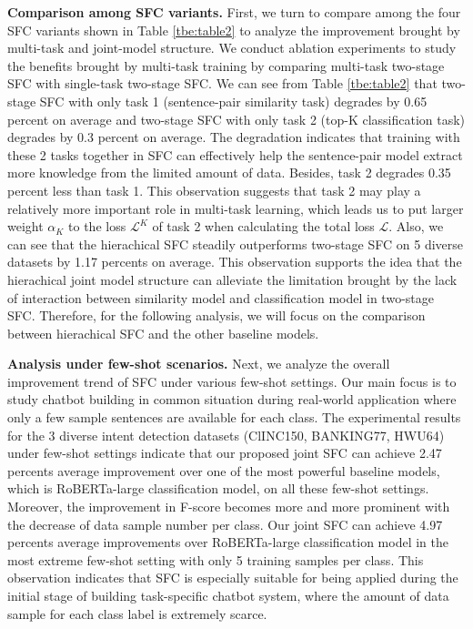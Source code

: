 \documentclass[letterpaper]{article} %
\begin{document}
  \textbf{Comparison  among  SFC  variants.} First, we turn to compare among the
  four  SFC  variants shown in Table \ref{tbe:table2} to analyze the improvement
  brought  by  multi-task  and  joint-model  structure. We conduct
  ablation  experiments  to study the benefits brought by multi-task training by
  comparing multi-task two-stage SFC with single-task two-stage SFC. We can see from
  Table  \ref{tbe:table2}  that  two-stage  SFC  with  only  task 1 (sentence-pair
  similarity task) degrades by 0.65 percent on average and two-stage SFC with only
  task  2  (top-K  classification  task) degrades by 0.3 percent on average. The
  degradation  indicates  that  training  with these 2 tasks together in SFC can
  effectively  help  the  sentence-pair  model  extract  more knowledge from the
  limited  amount  of data. Besides, task 2 degrades 0.35 percent less than task
  1.  This observation suggests that task 2 may play a relatively more important
  role  in multi-task learning, which leads us to put larger weight $\alpha_{K}$
  to  the  loss  $\mathcal{L}^{K}$  of  task  2  when calculating the total loss
  $\mathcal{L}$.  Also, we can see that the hierachical SFC steadily outperforms
  two-stage  SFC  on  5  diverse  datasets  by  1.17  percents  on  average.  This
  observation  supports  the idea that the hierachical joint model structure can
  alleviate the limitation brought by the lack of interaction between similarity
  model  and  classification  model in two-stage SFC. Therefore, for the following
  analysis,  we  will  focus  on  the comparison between hierachical SFC and the
  other baseline models.

  \textbf{Analysis  under  few-shot  scenarios.}  Next,  we  analyze the overall
  improvement trend of SFC under various few-shot settings. Our main focus is to
  study chatbot building in common situation during real-world application where
  only  a  few  sample  sentences are available for each class. The experimental
  results  for  the  3  diverse  intent detection datasets (ClINC150, BANKING77,
  HWU64) under few-shot settings indicate that our proposed joint SFC can
  achieve  2.47  percents  average  improvement  over  one  of the most powerful
  baseline  models,  which  is  RoBERTa-large classification model, on all these
  few-shot  settings. Moreover, the improvement in F-score becomes more and more
  prominent  with the decrease of data sample number per class. Our joint
  SFC   can  achieve  4.97  percents  average  improvements  over  RoBERTa-large
  classification model in the most extreme few-shot setting with only 5 training
  samples  per class. This observation indicates that SFC is especially suitable
  for  being  applied during the initial stage of building task-specific chatbot
  system,  where  the  amount  of  data sample for each class label is extremely
  scarce.
\end{document}
